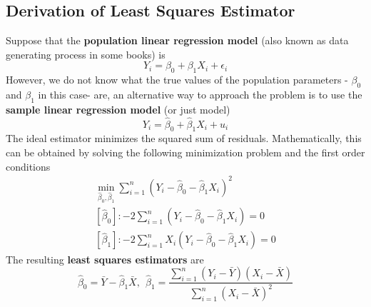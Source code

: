 \documentclass[12pt]{article}
\theoremstyle{definition}
\theoremstyle{property}
\theoremstyle{assumption}
\theoremstyle{example}
\theoremstyle{comment}
\begin{document}
\subsection{Derivation of Least Squares Estimator}
Suppose that the \textbf{population linear regression model} (also known as data generating process in some books) is
\[
Y_i = \beta_0 + \beta_1X_i + \epsilon_i
\]
However, we do not know what the true values of the population parameters - $\beta_0$ and $\beta_1$ in this case- are, an alternative way to approach the problem is to use the \textbf{sample linear regression model} (or just model)
\[
Y_i = \hat{\beta}_0 +\hat{\beta}_1X_i +u_i
\]
The ideal estimator minimizes the squared sum of residuals. Mathematically, this can be obtained by solving the following minimization problem and the first order conditions
\footnotesize{\begin{gather*}
\min_{\hat{\beta}_0, \hat{\beta}_1} \sum_{i=1}^n (Y_i-\hat{\beta}_0 - \hat{\beta}_1X_i)^2\\
[\hat{\beta}_0]: -2\sum_{i=1}^n(Y_i-\hat{\beta}_0-\hat{\beta}_1X_i)=0\\
[\hat{\beta}_1]: -2\sum_{i=1}^nX_i(Y_i-\hat{\beta}_0-\hat{\beta}_1X_i)=0 
\end{gather*}}\normalsize
The resulting \textbf{least squares estimators} are
\[
\hat{\beta}_0 = \bar{Y}-\hat{\beta}_1\bar{X}, \ \ \hat{\beta}_1=\frac{\sum_{i=1}^n(Y_i-\bar{Y})(X_i-\bar{X})}{\sum_{i=1}^n(X_i-\bar{X})^2}
\]
\end{document}
